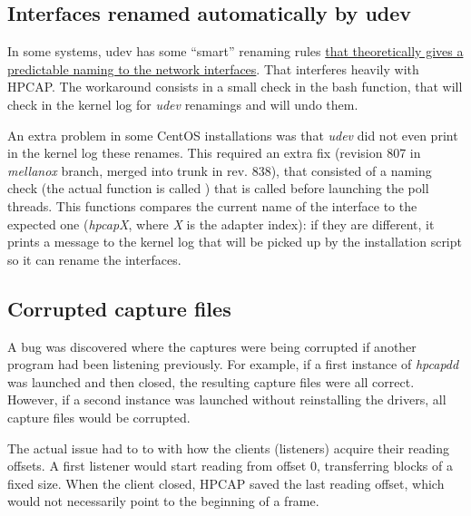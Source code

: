 \subsection{Interfaces renamed automatically by udev}
\label{sec:bugs:IfaceRenaming}

\begin{bugdata}
\end{bugdata}

In some systems, udev has some ``smart'' renaming rules \href{http://www.freedesktop.org/wiki/Software/systemd/PredictableNetworkInterfaceNames/}{that theoretically gives a predictable naming to the network interfaces}. That interferes heavily with HPCAP. The workaround consists in a small check in the  bash function, that will check in the kernel log for \textit{udev} renamings and will undo them.

An extra problem in some CentOS installations was that \textit{udev} did not even print in the kernel log these renames. This required an extra fix (revision 807 in \textit{mellanox} branch, merged into trunk in rev. 838), that consisted of a naming check (the actual function is called ) that is called before launching the poll threads. This functions compares the current name of the interface to the expected one (\textit{hpcapX}, where \textit{X} is the adapter index): if they are different, it prints a message to the kernel log that will be picked up by the installation script so it can rename the interfaces.

\subsection{Corrupted capture files}
\label{sec:bugs:CorruptedCapture}

\begin{bugdata}
\bugfixed[r842, r869]
\end{bugdata}

A bug was discovered where the captures were being corrupted if another program had been listening previously. For example, if a first instance of \textit{hpcapdd} was launched and then closed, the resulting capture files were all correct. However, if a second instance was launched without reinstalling the drivers, all capture files would be corrupted.

The actual issue had to to with how the clients (listeners) acquire their reading offsets. A first listener would start reading from offset 0, transferring blocks of a fixed size. When the client closed, HPCAP saved the last reading offset, which would not necessarily point to the beginning of a frame.

